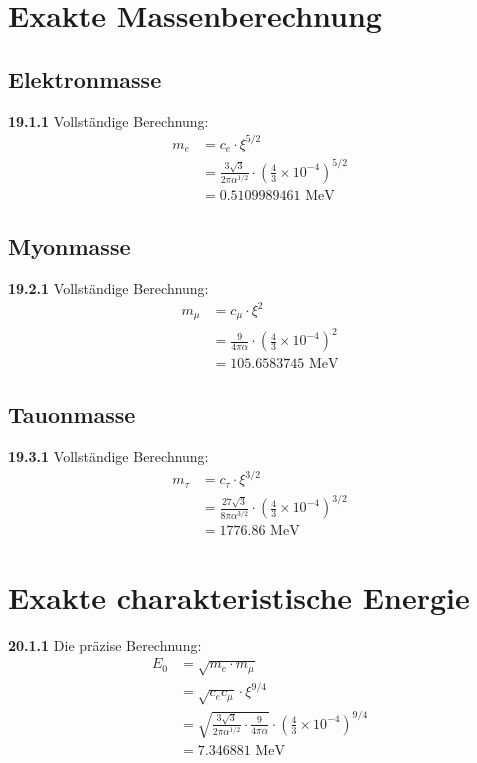 \documentclass[12pt,a4paper]{article}
\begin{document}
\section{Exakte Massenberechnung}

\subsection{Elektronmasse}
\noindent \textbf{19.1.1} Vollständige Berechnung:
\begin{align}
	m_e &= c_e \cdot \xi^{5/2} \\
	&= \frac{3\sqrt{3}}{2\pi\alpha^{1/2}} \cdot \left(\frac{4}{3} \times 10^{-4}\right)^{5/2} \\
	&= 0.5109989461 \text{ MeV}
\end{align}

\subsection{Myonmasse}
\noindent \textbf{19.2.1} Vollständige Berechnung:
\begin{align}
	m_\mu &= c_\mu \cdot \xi^2 \\
	&= \frac{9}{4\pi\alpha} \cdot \left(\frac{4}{3} \times 10^{-4}\right)^2 \\
	&= 105.6583745 \text{ MeV}
\end{align}

\subsection{Tauonmasse}
\noindent \textbf{19.3.1} Vollständige Berechnung:
\begin{align}
	m_\tau &= c_\tau \cdot \xi^{3/2} \\
	&= \frac{27\sqrt{3}}{8\pi\alpha^{3/2}} \cdot \left(\frac{4}{3} \times 10^{-4}\right)^{3/2} \\
	&= 1776.86 \text{ MeV}
\end{align}

	
\section{Exakte charakteristische Energie}
\noindent \textbf{20.1.1} Die präzise Berechnung:
\begin{align}
	E_0 &= \sqrt{m_e \cdot m_\mu} \\
	&= \sqrt{c_e c_\mu} \cdot \xi^{9/4} \\
	&= \sqrt{\frac{3\sqrt{3}}{2\pi\alpha^{1/2}} \cdot \frac{9}{4\pi\alpha}} \cdot \left(\frac{4}{3} \times 10^{-4}\right)^{9/4} \\
	&= 7.346881 \text{ MeV}
\end{align}
\end{document}

